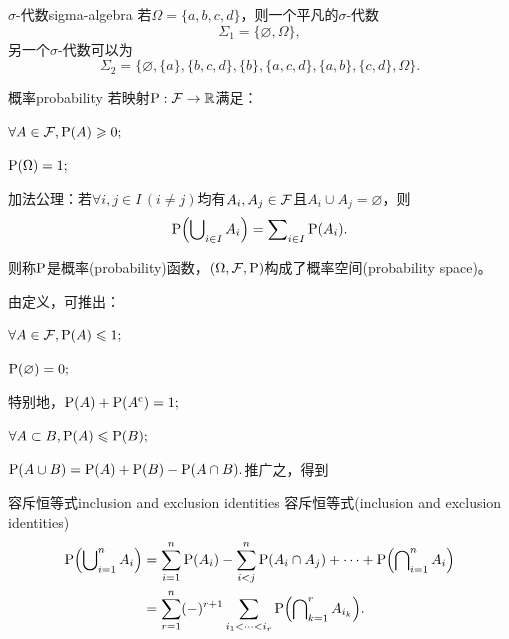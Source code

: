 \begin{example}{$\sigma$-代数}{sigma-algebra}
	若$\Omega = \{a,b,c,d\}$，则一个平凡的$\sigma$-代数
	\[
		\Sigma_1 = \{\varnothing, \Omega\},
	\]
	另一个$\sigma$-代数可以为
	\[
		\Sigma_2 = \{\varnothing,\{a\},\{b,c,d\},\{b\},\{a,c,d\},\{a,b\},\{c,d\},\Omega\}.
	\]
\end{example}
\begin{definition}{概率}{probability}
	若映射$\P:\eventspace \to \RR$满足：
	\begin{compactenum}
		\item $\forall A \in \eventspace,\P(A) \geqslant 0;$
		\item $\P (\Omega) = 1;$
		\item 加法公理：若$\forall i,j \in I\,(i \neq j)$均有$A_i,A_j \in \eventspace$且$A_i \cup A_j = \varnothing$，则
		\begin{equation}
			\P\Bigp{\bigcup\nolimits_{i\in I} A_i} = \sum\nolimits_{i\in I}\P(A_i).
		\end{equation}
	\end{compactenum}
	则称$\P$是概率(probability)函数，$(\Omega,\eventspace,\P)$构成了概率空间(probability space)。
\end{definition}
\begin{corollary}
	由定义，可推出：
	\begin{compactenum}
		\item $\forall A \in \eventspace,\P(A) \leqslant 1;$
		\item $\P(\varnothing) = 0;$
		\item 
		特别地，$\P(A) + \P(A\eventcomp) = 1;$
		\item $\forall A \subset B,\P(A) \leqslant \P(B);$
		\item $\P(A \cup B) = \P(A) + \P(B) - \P(A \cap B).$推广之，得到
	\end{compactenum}
\end{corollary}
\begin{theorem}{容斥恒等式}{inclusion and exclusion identities}
	容斥恒等式(inclusion and exclusion identities)
	\begin{align}\notag
		\P\Bigp{\bigcup\nolimits_{i=1}^nA_i} &= \sum_{i=1}^n\P(A_i) - \sum_{i<j}^n\P(A_i \cap A_j) + \cdots + \P\Bigp{\bigcap\nolimits_{i=1}^nA_i}\\
		&= \sum_{r=1}^n(-)^{r+1}\sum_{i_1<\cdots<i_r}\P\Bigp{\bigcap\nolimits_{k=1}^rA_{i_k}}.
	\end{align}
\end{theorem}
